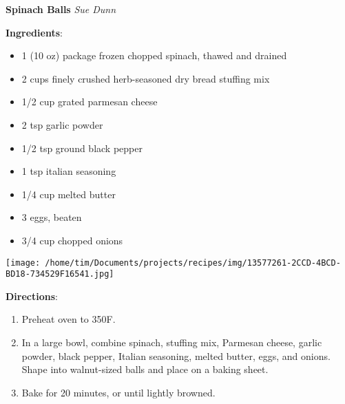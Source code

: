 \documentclass[11pt, twoside, openany]{book}
\begin{document}
\noindent\begin{minipage}[t]{\linewidth}%
{\Large\textbf{Spinach Balls}} \label{spinach-balls}\hfill\textit{Sue Dunn}\\
\noindent\begin{minipage}[t]{0.78\linewidth}%
\textbf{Ingredients}:\vspace{-3mm}
\begin{multicols}{2}
\begin{itemize}\setlength\itemsep{-1mm}
\item 1 (10 oz) package frozen chopped spinach, thawed and drained
\item 2 cups finely crushed herb-seasoned dry bread stuffing mix
\item 1/2 cup grated parmesan cheese
\item 2 tsp garlic powder
\item 1/2 tsp ground black pepper
\item 1 tsp italian seasoning
\item 1/4 cup melted butter
\item 3 eggs, beaten
\item 3/4 cup chopped onions
\end{itemize}
\end{multicols}
\end{minipage}
\noindent\begin{minipage}[t]{0.18\linewidth}
\centering \strut\vspace*{-\baselineskip}\newline
\texttt{[image: /home/tim/Documents/projects/recipes/img/13577261-2CCD-4BCD-BD18-734529F16541.jpg]}\\
\end{minipage}\vspace{3mm}
\textbf{Directions}:
\vspace{-3mm}\begin{enumerate}\setlength\itemsep{-1mm}
\item Preheat oven to 350F.
\item In a large bowl, combine spinach, stuffing mix, Parmesan cheese, garlic powder, black pepper, Italian seasoning, melted butter, eggs, and onions. Shape into walnut-sized balls and place on a baking sheet.
\item Bake for 20 minutes, or until lightly browned.
\end{enumerate}
\end{minipage}\vspace{8mm}
\end{document}
